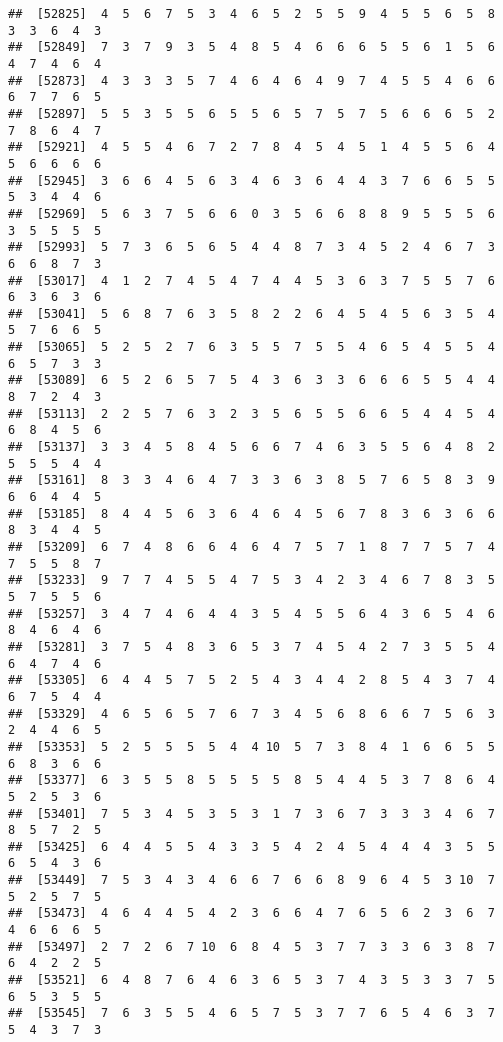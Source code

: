 \documentclass[
]{book}
\begin{document}
\begin{verbatim}
##  [52825]  4  5  6  7  5  3  4  6  5  2  5  5  9  4  5  5  6  5  8  3  3  6  4  3
##  [52849]  7  3  7  9  3  5  4  8  5  4  6  6  6  5  5  6  1  5  6  4  7  4  6  4
##  [52873]  4  3  3  3  5  7  4  6  4  6  4  9  7  4  5  5  4  6  6  6  7  7  6  5
##  [52897]  5  5  3  5  5  6  5  5  6  5  7  5  7  5  6  6  6  5  2  7  8  6  4  7
##  [52921]  4  5  5  4  6  7  2  7  8  4  5  4  5  1  4  5  5  6  4  5  6  6  6  6
##  [52945]  3  6  6  4  5  6  3  4  6  3  6  4  4  3  7  6  6  5  5  5  3  4  4  6
##  [52969]  5  6  3  7  5  6  6  0  3  5  6  6  8  8  9  5  5  5  6  3  5  5  5  5
##  [52993]  5  7  3  6  5  6  5  4  4  8  7  3  4  5  2  4  6  7  3  6  6  8  7  3
##  [53017]  4  1  2  7  4  5  4  7  4  4  5  3  6  3  7  5  5  7  6  6  3  6  3  6
##  [53041]  5  6  8  7  6  3  5  8  2  2  6  4  5  4  5  6  3  5  4  5  7  6  6  5
##  [53065]  5  2  5  2  7  6  3  5  5  7  5  5  4  6  5  4  5  5  4  6  5  7  3  3
##  [53089]  6  5  2  6  5  7  5  4  3  6  3  3  6  6  6  5  5  4  4  8  7  2  4  3
##  [53113]  2  2  5  7  6  3  2  3  5  6  5  5  6  6  5  4  4  5  4  6  8  4  5  6
##  [53137]  3  3  4  5  8  4  5  6  6  7  4  6  3  5  5  6  4  8  2  5  5  5  4  4
##  [53161]  8  3  3  4  6  4  7  3  3  6  3  8  5  7  6  5  8  3  9  6  6  4  4  5
##  [53185]  8  4  4  5  6  3  6  4  6  4  5  6  7  8  3  6  3  6  6  8  3  4  4  5
##  [53209]  6  7  4  8  6  6  4  6  4  7  5  7  1  8  7  7  5  7  4  7  5  5  8  7
##  [53233]  9  7  7  4  5  5  4  7  5  3  4  2  3  4  6  7  8  3  5  5  7  5  5  6
##  [53257]  3  4  7  4  6  4  4  3  5  4  5  5  6  4  3  6  5  4  6  8  4  6  4  6
##  [53281]  3  7  5  4  8  3  6  5  3  7  4  5  4  2  7  3  5  5  4  6  4  7  4  6
##  [53305]  6  4  4  5  7  5  2  5  4  3  4  4  2  8  5  4  3  7  4  6  7  5  4  4
##  [53329]  4  6  5  6  5  7  6  7  3  4  5  6  8  6  6  7  5  6  3  2  4  4  6  5
##  [53353]  5  2  5  5  5  5  4  4 10  5  7  3  8  4  1  6  6  5  5  6  8  3  6  6
##  [53377]  6  3  5  5  8  5  5  5  5  8  5  4  4  5  3  7  8  6  4  5  2  5  3  6
##  [53401]  7  5  3  4  5  3  5  3  1  7  3  6  7  3  3  3  4  6  7  8  5  7  2  5
##  [53425]  6  4  4  5  5  4  3  3  5  4  2  4  5  4  4  4  3  5  5  6  5  4  3  6
##  [53449]  7  5  3  4  3  4  6  6  7  6  6  8  9  6  4  5  3 10  7  5  2  5  7  5
##  [53473]  4  6  4  4  5  4  2  3  6  6  4  7  6  5  6  2  3  6  7  4  6  6  6  5
##  [53497]  2  7  2  6  7 10  6  8  4  5  3  7  7  3  3  6  3  8  7  6  4  2  2  5
##  [53521]  6  4  8  7  6  4  6  3  6  5  3  7  4  3  5  3  3  7  5  6  5  3  5  5
##  [53545]  7  6  3  5  5  4  6  5  7  5  3  7  7  6  5  4  6  3  7  5  4  3  7  3

\end{verbatim}
\end{document}
